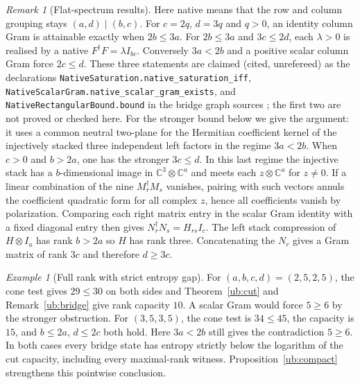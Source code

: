 \documentclass[aps,pra,onecolumn,superscriptaddress,nofootinbib,10pt]{revtex4-2}
\theoremstyle{definition}
\theoremstyle{remark}
\newtheorem{remark}[theorem]{Remark}
\newtheorem{example}[theorem]{Example}
\begin{document}
\begin{remark}[Flat-spectrum results]\label{ub:flat}
Here native means that the row and column grouping stays
$(a,d)\mid(b,c)$. For $c=2q$, $d=3q$ and $q>0$, an identity column Gram is
attainable exactly when $2b\le3a$.
For $2b\le3a$ and $3c\le2d$, each $\lambda>0$ is realised by a
native $F^\dagger F=\lambda I_{bc}$.
Conversely $3a<2b$ and a positive scalar column Gram force
$2c\le d$. These three statements are claimed (cited, unrefereed) as the declarations
\texttt{NativeSaturation.native\_saturation\_iff},
\texttt{NativeScalarGram.native\_scalar\_gram\_exists}, and
\texttt{NativeRectangularBound.bound} in the bridge graph sources
\cite{ub:lean}; the first two are not proved or checked here.  For the stronger bound below we give the argument: it uses a common neutral two-plane for
the Hermitian coefficient kernel of the injectively stacked
three independent left factors in the regime $3a<2b$. When
$c>0$ and $b>2a$, one has the stronger $3c\le d$. In this last
regime the injective stack has a $b$-dimensional image in
$\mathbb C^3\otimes\mathbb C^a$ and meets each
$z\otimes\mathbb C^a$ for $z\ne0$. If a linear combination of the
nine $M_r^\dagger M_s$ vanishes, pairing with such vectors
annuls the coefficient quadratic form for all complex $z$, hence
all coefficients vanish by polarization. Comparing each right
matrix entry in the scalar Gram identity with a fixed diagonal
entry then gives $N_r^\dagger N_s=H_{rs}I_c$. The left stack
compression of $H\otimes I_a$ has rank $b>2a$ so $H$ has rank
three. Concatenating the $N_r$ gives a Gram matrix of rank $3c$
and therefore $d\ge3c$.
\end{remark}

\begin{example}[Full rank with strict entropy gap]\label{ub:flatcounter}
For $(a,b,c,d)=(2,5,2,5)$, the cone test gives $29\le30$
on both sides and Theorem~\ref{ub:cut} and Remark~\ref{ub:bridge}
give rank capacity $10$. A scalar Gram would force $5\ge6$
by the stronger obstruction. For $(3,5,3,5)$, the cone test is
$34\le45$, the capacity is $15$, and $b\le2a$, $d\le2c$ both hold.
Here $3a<2b$ still gives the contradiction $5\ge6$.
In both cases every bridge state has entropy strictly below the
logarithm of the cut capacity, including every maximal-rank witness.
Proposition~\ref{ub:compact} strengthens this pointwise conclusion.
\end{example}
\end{document}
